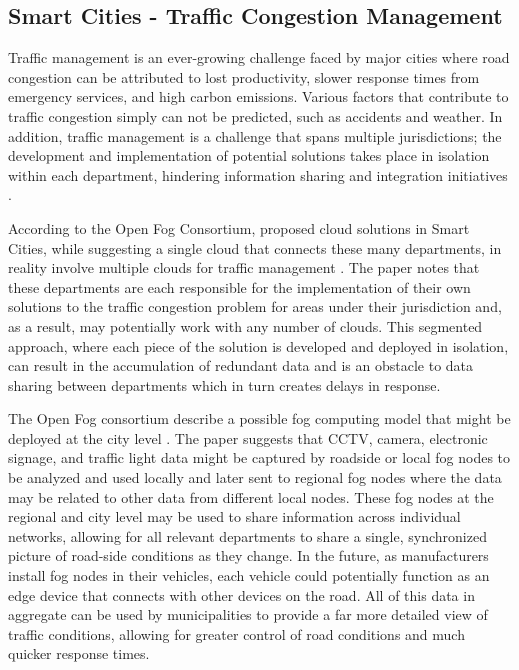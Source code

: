 \documentclass{article}
\begin{document}
\subsection{Smart Cities - Traffic Congestion Management}
Traffic management is an ever-growing challenge faced by major cities where road congestion can be attributed to lost productivity, slower response times from emergency services, and high carbon emissions. Various factors that contribute to traffic congestion simply can not be predicted, such as accidents and weather. In addition, traffic management is a challenge that spans multiple jurisdictions; the development and implementation of potential solutions takes place in isolation within each department, hindering information sharing and integration initiatives \cite{openfogconsortium2017trafficmanagement}.

According to the Open Fog Consortium, proposed cloud solutions in Smart Cities, while suggesting a single cloud that connects these many departments, in reality involve multiple clouds for traffic management \cite{openfogconsortium2017trafficmanagement}. The paper notes that these departments are each responsible for the implementation of their own solutions to the traffic congestion problem for areas under their jurisdiction and, as a result, may potentially work with any number of clouds. This segmented approach, where each piece of the solution is developed and deployed in isolation, can result in the accumulation of redundant data and is an obstacle to data sharing between departments which in turn creates delays in response.

The Open Fog consortium describe a possible fog computing model that might be deployed at the city level \cite{openfogconsortium2017trafficmanagement}. The paper suggests that CCTV, camera, electronic signage, and traffic light data might be  captured by roadside or local fog nodes to be analyzed and used locally and later sent to regional fog nodes where the data may be related to other data from different local nodes. These fog nodes at the regional and city level may be used to share information across individual networks, allowing for all relevant departments to share a single, synchronized picture of road-side conditions as they change. In the future, as manufacturers install fog nodes in their vehicles, each vehicle could potentially function as an edge device that connects with other devices on the road. All of this data in aggregate can be used by municipalities to provide a far more detailed view of traffic conditions, allowing for greater control of road conditions and much quicker response times.

\pagebreak

\renewcommand{\refname}{\section{References}}


\end{document}
